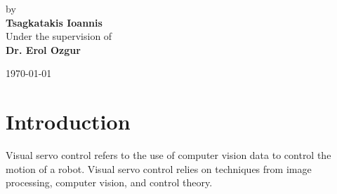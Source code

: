 \documentclass[a4paper,12pt]{article}
\begin{document}
\begin{center}
{ \Large 
        by \\[0.25cm]
        \textbf{Tsagkatakis Ioannis} \\[1.5cm]
        Under the supervision of \\[0.25cm]
        \textbf{Dr. Erol Ozgur} \\
}
\end{center}
\vspace*{2cm}
\begin{center}
        \today
\end{center}
\newpage
\tableofcontents 
\section{Introduction}
Visual servo control refers to the use of computer vision data to control  the  motion  of  a  robot. Visual servo control relies on techniques from image processing,  computer  vision,  and  control  theory.   
\end{document}
